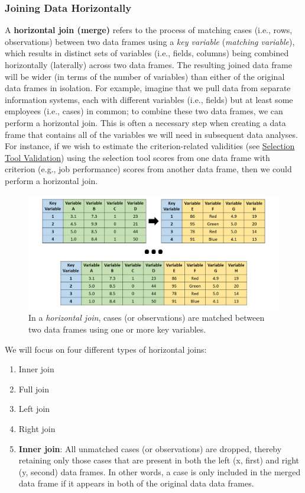 \documentclass[]{book}
\begin{document}
\subsubsection{Joining Data
Horizontally}\label{joining-data-horizontally}

A \textbf{horizontal join (merge)} refers to the process of matching
cases (i.e., rows, observations) between two data frames using a
\emph{key variable} (\emph{matching variable}), which results in
distinct sets of variables (i.e., fields, columns) being combined
horizontally (laterally) across two data frames. The resulting joined
data frame will be wider (in terms of the number of variables) than
either of the original data frames in isolation. For example, imagine
that we pull data from separate information systems, each with different
variables (i.e., fields) but at least some employees (i.e., cases) in
common; to combine these two data frames, we can perform a horizontal
join. This is often a necessary step when creating a data frame that
contains all of the variables we will need in subsequent data analyses.
For instance, if we wish to estimate the criterion-related validities
(see \protect\hyperlink{selectiontoolvalidation}{Selection Tool
Validation}) using the selection tool scores from one data frame with
criterion (e.g., job performance) scores from another data frame, then
we could perform a horizontal join.

\begin{figure}
\centering
\includegraphics{horizontal_join.png}
\caption{In a \emph{horizontal join}, cases (or observations) are
matched between two data frames using one or more key variables.}
\end{figure}

We will focus on four different types of horizontal joins:

\begin{enumerate}
\def\labelenumi{\arabic{enumi}.}
\item
  Inner join
\item
  Full join
\item
  Left join
\item
  Right join
\item
  \textbf{Inner join}: All unmatched cases (or observations) are
  dropped, thereby retaining only those cases that are present in both
  the left (x, first) and right (y, second) data frames. In other words,
  a case is only included in the merged data frame if it appears in both
  of the original data data frames.
\end{enumerate}
\end{document}
